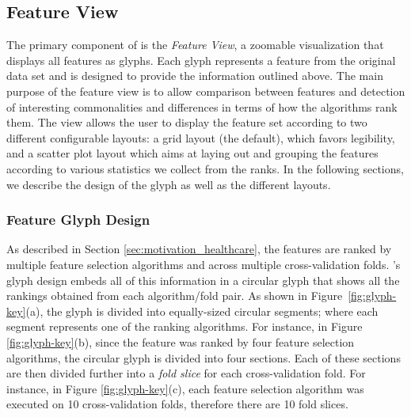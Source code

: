 \subsection{Feature View}
The primary component of \infuse is the \textit{Feature View}, a zoomable visualization that displays all features as glyphs. Each glyph represents a feature from the original data set and is designed to provide the information outlined above. The main purpose of the feature view is to allow comparison between features and detection of interesting commonalities and differences in terms of how the algorithms rank them. The view allows the user to display the feature set according to two different configurable layouts: a grid layout (the default), which favors legibility, and a scatter plot layout which aims at laying out and grouping the features according to various statistics we collect from the ranks. In the following sections, we describe the design of the glyph as well as the different layouts.


\subsubsection{Feature Glyph Design}\label{sec:glyphdesign}
As described in Section \ref{sec:motivation_healthcare}, the features are ranked by multiple feature selection algorithms and across multiple cross-validation folds.  \infuse's glyph design embeds all of this information in a circular glyph that shows all the rankings obtained from each algorithm/fold pair. As shown in Figure~\ref{fig:glyph-key}(a), the glyph is divided into equally-sized circular segments; where each segment represents one of the ranking algorithms.
For instance, in Figure \ref{fig:glyph-key}(b), since the feature was ranked by four feature selection algorithms, the circular glyph is divided into four sections. Each of these sections are then divided further into a \emph{fold slice} for each cross-validation fold. For instance, in Figure \ref{fig:glyph-key}(c), each feature selection algorithm was executed on 10 cross-validation folds, therefore there are 10 fold slices.

